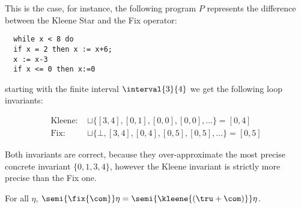 \begin{example} \label{ex:fix}
  This is the case, for instance, the following program \(P\)
  represents the difference between the Kleene Star and the Fix
  operator:
\begin{verbatim}
  while x < 8 do
  if x = 2 then x := x+6;
  x := x-3
  if x <= 0 then x:=0
\end{verbatim}
starting with the finite interval \(\interval{3}{4}\) we get the
following loop invariants:

\begin{align*}
  \text{Kleene: } &\sqcup\{[3,4], [0,1], [0,0], [0,0], \ldots\} = [0,4]\\[5pt]
  \text{Fix: } & \sqcup\{\bot, [3,4], [0,4], [0,5], [0,5],\ldots\} = [0,5]
\end{align*}

\noindent
Both invariants are correct, because they over-approximate the most
precise concrete invariant \(\{0,1,3,4\}\), however the Kleene
invariant is strictly more precise than the Fix one.
\end{example}

\begin{lemma}\label{le:sugar}
  For all \(\eta\),
  \(\semi{\fix{\com}} \eta = \semi{\kleene{(\tru + \com)}} \eta\).
\end{lemma}

